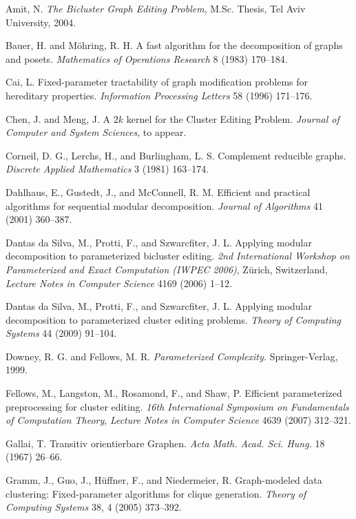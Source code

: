 \documentclass[12pt]{article}
\begin{document}
\begin{thebibliography}{99}

Amit, N. \emph{The Bicluster Graph Editing Problem}, M.Sc. Thesis,
Tel Aviv University, 2004.

Bauer, H. and M\"ohring, R. H. A fast algorithm for the decomposition of graphs and posets.
{\em Mathematics of Operations Research} 8 (1983) 170--184.

Cai, L. Fixed-parameter tractability of graph modification
problems for hereditary properties. {\em Information Processing
Letters} 58 (1996) 171--176.

Chen, J. and Meng, J. A $2k$ kernel for the Cluster Editing Problem.
{\em Journal of Computer and System Sciences}, to appear.

Corneil, D. G., Lerchs, H., and Burlingham, L. S. Complement
reducible graphs. {\em Discrete Applied Mathematics} 3 (1981)
163--174.

Dahlhaus, E., Gustedt, J., and McConnell, R. M. Efficient and practical algorithms for sequential modular decomposition. {\em Journal of Algorithms} 41 (2001) 360--387.

Dantas da Silva, M., Protti, F., and Szwarcfiter, J. L.
Applying modular decomposition to parameterized bicluster editing.
{\em 2nd International Workshop on Parameterized and Exact Computation (IWPEC 2006)}, Z\"{u}rich, Switzerland,
{\em Lecture Notes in Computer Science} 4169 (2006) 1--12.

Dantas da Silva, M., Protti, F., and Szwarcfiter, J. L.
Applying modular decomposition to parameterized cluster editing problems.
{\em Theory of Computing Systems} 44 (2009) 91--104.

Downey, R. G. and Fellows, M. R.
\emph{Parameterized Complexity.} Springer-Verlag, 1999.

Fellows, M., Langston, M., Rosamond, F., and Shaw, P. Efficient
parameterized preprocessing for cluster editing.
\emph{16th International Symposium on Fundamentals of Computation Theory}, \emph{Lecture Notes in
Computer Science} 4639 (2007) 312--321.

Gallai, T. Transitiv orientierbare Graphen.
{\em Acta Math. Acad. Sci. Hung.} 18 (1967) 26--66.

Gramm, J., Guo, J., H\"uffner, F., and Niedermeier, R. Graph-modeled
data clustering: Fixed-parameter algorithms for clique generation.
{\em Theory of Computing Systems} 38, 4 (2005) 373--392.


\end{thebibliography}
\end{document}
